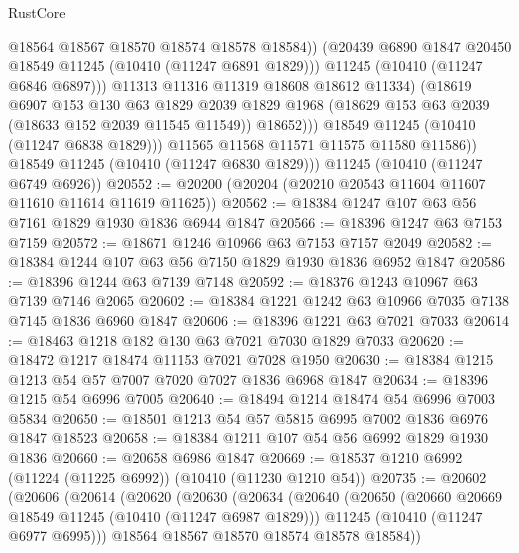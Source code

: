 \begin{lexlean}{RustCore}
\begin{coremodule}
                        @18564
                        @18567
                        @18570
                        @18574
                        @18578
                        @18584))
                    (@20439 @6890 @1847 @20450 @18549 @11245 (@10410 (@11247 @6891 @1829)))
                    @11245
                    (@10410 (@11247 @6846 @6897)))
                  @11313
                  @11316
                  @11319
                  @18608
                  @18612
                  @11334)
                (@18619
                  @6907
                  @153
                  @130
                  @63
                  @1829
                  @2039
                  @1829
                  @1968
                  (@18629 @153 @63 @2039 (@18633 @152 @2039 @11545 @11549))
                  @18652)))
            @18549
            @11245
            (@10410 (@11247 @6838 @1829)))
          @11565
          @11568
          @11571
          @11575
          @11580
          @11586))
      @18549
      @11245
      (@10410 (@11247 @6830 @1829)))
    @11245
    (@10410 (@11247 @6749 @6926))
@20552 := @20200 (@20204 (@20210 @20543 @11604 @11607 @11610 @11614 @11619 @11625))
@20562 := @18384 @1247 @107 @63 @56 @7161 @1829 @1930 @1836 @6944 @1847
@20566 := @18396 @1247 @63 @7153 @7159
@20572 := @18671 @1246 @10966 @63 @7153 @7157 @2049
@20582 := @18384 @1244 @107 @63 @56 @7150 @1829 @1930 @1836 @6952 @1847
@20586 := @18396 @1244 @63 @7139 @7148
@20592 := @18376 @1243 @10967 @63 @7139 @7146 @2065
@20602 := @18384 @1221 @1242 @63 @10966 @7035 @7138 @7145 @1836 @6960 @1847
@20606 := @18396 @1221 @63 @7021 @7033
@20614 := @18463 @1218 @182 @130 @63 @7021 @7030 @1829 @7033
@20620 := @18472 @1217 @18474 @11153 @7021 @7028 @1950
@20630 := @18384 @1215 @1213 @54 @57 @7007 @7020 @7027 @1836 @6968 @1847
@20634 := @18396 @1215 @54 @6996 @7005
@20640 := @18494 @1214 @18474 @54 @6996 @7003 @5834
@20650 := @18501 @1213 @54 @57 @5815 @6995 @7002 @1836 @6976 @1847 @18523
@20658 := @18384 @1211 @107 @54 @56 @6992 @1829 @1930 @1836
@20660 := @20658 @6986 @1847
@20669 := @18537 @1210 @6992 (@11224 (@11225 @6992)) (@10410 (@11230 @1210 @54))
@20735 := @20602
    (@20606
      (@20614
        (@20620
          (@20630
            (@20634
              (@20640
                (@20650
                  (@20660 @20669 @18549 @11245 (@10410 (@11247 @6987 @1829)))
                  @11245
                  (@10410 (@11247 @6977 @6995)))
                @18564
                @18567
                @18570
                @18574
                @18578
                @18584))

\end{coremodule}
\end{lexlean}
